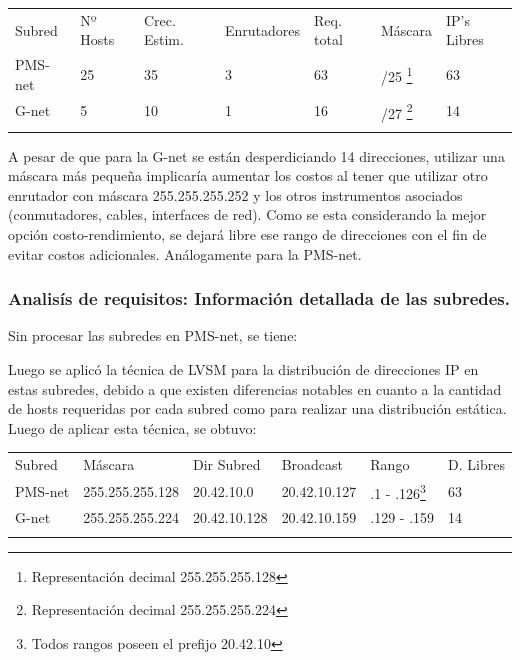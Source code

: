 \documentclass[]{article}
\begin{document}
\begin{longtable}[c]{@{}lllllll@{}}
\toprule\addlinespace
Subred & Nº Hosts & Crec. Estim. & Enrutadores & Req. total & Máscara &
IP's Libres
\\\addlinespace
\midrule\endhead
PMS-net & 25 & 35 & 3 & 63 & /25 \footnote{Representación decimal
  255.255.255.128} & 63
\\\addlinespace
G-net & 5 & 10 & 1 & 16 & /27 \footnote{Representación decimal
  255.255.255.224} & 14
\\\addlinespace
\bottomrule
\end{longtable}

A pesar de que para la G-net se están desperdiciando 14 direcciones,
utilizar una máscara más pequeña implicaría aumentar los costos al tener
que utilizar otro enrutador con máscara 255.255.255.252 y los otros
instrumentos asociados (conmutadores, cables, interfaces de red). Como
se esta considerando la mejor opción costo-rendimiento, se dejará libre
ese rango de direcciones con el fin de evitar costos adicionales.
Análogamente para la PMS-net.

\newpage

\subsubsection{Analisís de requisitos: Información detallada de las
subredes.}\label{analisuxeds-de-requisitos-informaciuxf3n-detallada-de-las-subredes.}

Sin procesar las subredes en PMS-net, se tiene:

Luego se aplicó la técnica de LVSM para la distribución de direcciones
IP en estas subredes, debido a que existen diferencias notables en
cuanto a la cantidad de hosts requeridas por cada subred como para
realizar una distribución estática. Luego de aplicar esta técnica, se
obtuvo:

\begin{longtable}[c]{@{}llllll@{}}
\toprule\addlinespace
Subred & Máscara & Dir Subred & Broadcast & Rango & D. Libres
\\\addlinespace
\midrule\endhead
PMS-net & 255.255.255.128 & 20.42.10.0 & 20.42.10.127 & .1 -
.126\footnote{Todos rangos poseen el prefijo 20.42.10} & 63
\\\addlinespace
G-net & 255.255.255.224 & 20.42.10.128 & 20.42.10.159 & .129 - .159 & 14
\\\addlinespace
\bottomrule
\end{longtable}
\end{document}
